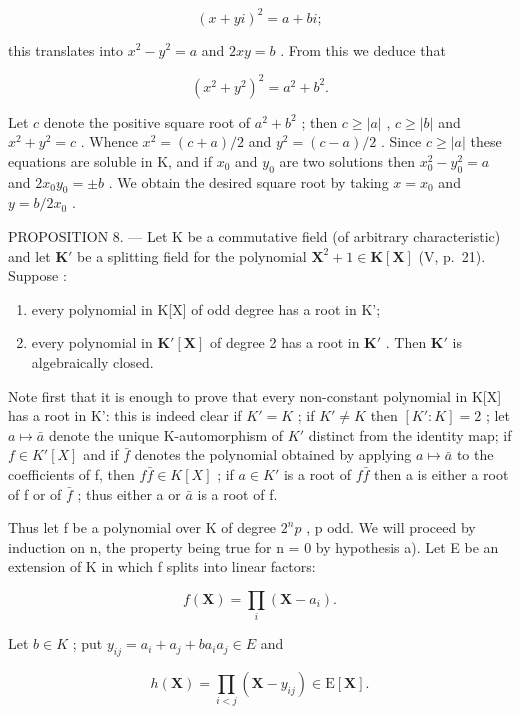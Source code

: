 \[
(x + y i) ^ {2} = a + b i;
\]

this translates into \(x^{2} - y^{2} = a\) and \(2xy = b\) . From this we deduce that

\[
(x ^ {2} + y ^ {2}) ^ {2} = a ^ {2} + b ^ {2}.
\]

Let \(c\) denote the positive square root of \(a^2 + b^2\) ; then \(c \geqslant |a|\) , \(c \geqslant |b|\) and \(x^2 + y^2 = c\) . Whence \(x^2 = (c + a)/2\) and \(y^2 = (c - a)/2\) . Since \(c \geqslant |a|\) these equations are soluble in K, and if \(x_0\) and \(y_0\) are two solutions then \(x_0^2 - y_0^2 = a\) and \(2x_0y_0 = \pm b\) . We obtain the desired square root by taking \(x = x_0\) and \(y = b/2x_0\) .

PROPOSITION 8. --- Let K be a commutative field (of arbitrary characteristic) and let \(\mathbf{K}'\) be a splitting field for the polynomial \(\mathbf{X}^2 + 1 \in \mathbf{K}[\mathbf{X}]\) (V, p.~21). Suppose :

\begin{enumerate}
\def\labelenumi{\alph{enumi})}
\item
  every polynomial in K{[}X{]} of odd degree has a root in K';
\item
  every polynomial in \(\mathbf{K}'[\mathbf{X}]\) of degree 2 has a root in \(\mathbf{K}'\) . Then \(\mathbf{K}'\) is algebraically closed.
\end{enumerate}

Note first that it is enough to prove that every non-constant polynomial in K{[}X{]} has a root in K': this is indeed clear if \(K' = K\) ; if \(K' \neq K\) then \([K': K] = 2\) ; let \(a \mapsto \bar{a}\) denote the unique K-automorphism of \(K'\) distinct from the identity map; if \(f \in K'[X]\) and if \(\bar{f}\) denotes the polynomial obtained by applying \(a \mapsto \bar{a}\) to the coefficients of f, then \(f\bar{f} \in K[X]\) ; if \(a \in K'\) is a root of \(f\bar{f}\) then a is either a root of f or of \(\bar{f}\) ; thus either a or \(\bar{a}\) is a root of f.

Thus let f be a polynomial over K of degree \(2^{n}p\) , p odd. We will proceed by induction on n, the property being true for n = 0 by hypothesis a). Let E be an extension of K in which f splits into linear factors:

\[
f (\mathbf {X}) = \prod_ {i} \left(\mathbf {X} - a _ {i}\right).
\]

Let \(b \in K\) ; put \(y_{ij} = a_i + a_j + ba_i a_j \in E\) and

\[
h (\mathbf {X}) = \prod_ {i <   j} \left(\mathbf {X} - y _ {i j}\right) \in \mathrm{E} [ \mathbf {X} ].
\]


